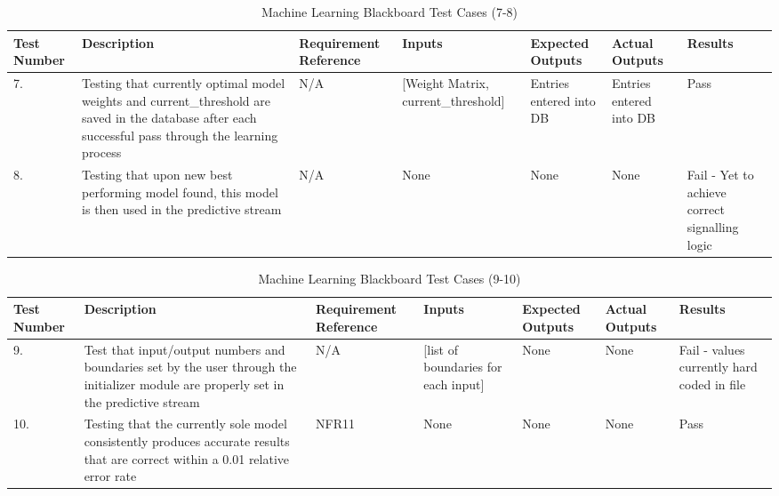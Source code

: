 \documentclass[12pt, titlepage]{article}
\begin{document}
\begin{center}
    \begin{table}[H]
        \centering
        \begin{tabular}{|p{1cm}|p{2.2cm}|p{2.5cm}|p{2.7cm}|p{2.4cm}|p{2.4cm}|p{1.3cm}|}
        \hline
        \bf Test Number & \bf Description & \bf Requirement Reference & \bf Inputs & \bf Expected Outputs & \bf Actual Outputs & \bf Results \\
        \hline
        7. & Testing that currently optimal model weights and current\_threshold are saved in the database after each successful pass through the learning process & N/A & [Weight Matrix, current\_threshold] & Entries entered into DB & Entries entered into DB & Pass\\
        \hline
        8. & Testing that upon new best performing model found, this model is then used in the predictive stream & N/A & None & None & None & Fail - Yet to achieve correct signalling logic\\
        \hline
        \end{tabular}
        \caption{Machine Learning Blackboard Test Cases (7-8)}
        \label{tab:my_label18}
    \end{table}
\end{center}


\begin{center}
    \begin{table}[H]
        \centering
        \begin{tabular}{|p{1cm}|p{2.2cm}|p{2.5cm}|p{2.7cm}|p{2.4cm}|p{2.4cm}|p{1.3cm}|}
        \hline
        \bf Test Number & \bf Description & \bf Requirement Reference & \bf Inputs & \bf Expected Outputs & \bf Actual Outputs & \bf Results \\
        \hline
        9. & Test that input/output numbers and boundaries set by the user through the initializer module are properly set in the predictive stream & N/A & [list of boundaries for each input] & None & None & Fail - values currently hard coded in file\\
        \hline
        10. & Testing that the currently sole model consistently produces accurate results that are correct within a 0.01 relative error rate & NFR11 & None & None & None & Pass\\
        \hline
        \end{tabular}
        \caption{Machine Learning Blackboard Test Cases (9-10)}
        \label{tab:my_label19}
    \end{table}
\end{center}
\end{document}
